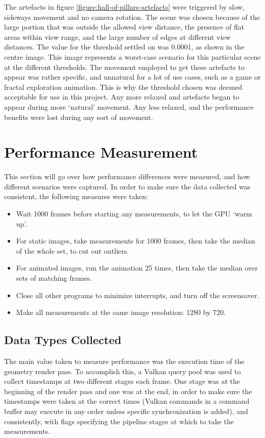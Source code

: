 The artefacts in figure \ref{figure:hall-of-pillars-artefacts} were triggered by slow, sideways movement and no camera rotation. The scene was chosen because of the large portion that was outside the allowed view distance, the presence of flat areas within view range, and the large number of edges at different view distances. The value for the threshold settled on was 0.0001, as shown in the centre image. This image represents a worst-case scenario for this particular scene at the different thresholds. The movement employed to get these artefacts to appear was rather specific, and unnatural for a lot of use cases, such as a game or fractal exploration animation. This is why the threshold chosen was deemed acceptable for use in this project. Any more relaxed and artefacts began to appear during more `natural' movement. Any less relaxed, and the performance benefits were lost during any sort of movement.

\section{Performance Measurement}

This section will go over how performance differences were measured, and how different scenarios were captured. In order to make sure the data collected was consistent, the following measures were taken:

\begin{itemize}
	\item Wait 1000 frames before starting any measurements, to let the GPU `warm up'.
	\item For static images, take measurements for 1000 frames, then take the median of the whole set, to cut out outliers.
	\item For animated images, run the animation 25 times, then take the median over sets of matching frames.
	\item Close all other programs to minimize interrupts, and turn off the screensaver.
	\item Make all measurements at the same image resolution: 1280 by 720.
\end{itemize}

\subsection{Data Types Collected}

The main value taken to measure performance was the execution time of the geometry render pass. To accomplish this, a Vulkan query pool was used to collect timestamps at two different stages each frame. One stage was at the beginning of the render pass and one was at the end, in order to make sure the timestamps were taken at the correct times (Vulkan commands in a command buffer may execute in any order unless specific synchronization is added), and consistently, with flags specifying the pipeline stages at which to take the measurements.\newline

